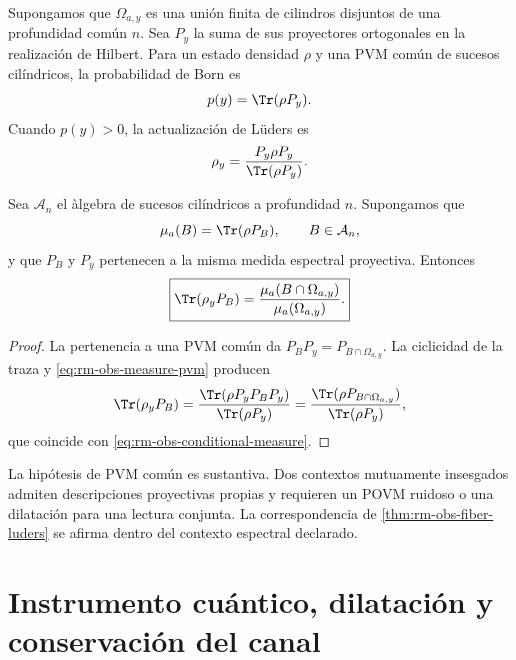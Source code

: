 Supongamos que \(\Omega_{a,y}\) es una uni\'on finita de cilindros
disjuntos de una profundidad com\'un \(n\). Sea \(P_y\) la suma de sus
proyectores ortogonales en la realizaci\'on de Hilbert. Para un estado
densidad \(\rho\) y una PVM com\'un de sucesos cil\'indricos, la probabilidad
de Born es
\begin{equation}
 p(y)=\Tr(\rho P_y).
 \label{eq:rm-obs-born}
\end{equation}
Cuando \(p(y)>0\), la actualizaci\'on de L\"uders \cite{Luders1951} es
\begin{equation}
 \rho_y=\frac{P_y\rho P_y}{\Tr(\rho P_y)}.
 \label{eq:rm-obs-luders}
\end{equation}

\begin{theorem}
\label{thm:rm-obs-fiber-luders}
Sea \(\mathcal A_n\) el \`algebra de sucesos cil\'indricos a profundidad
\(n\). Supongamos que
\begin{equation}
 \mu_a(B)=\Tr(\rho P_B),
 \qquad B\in\mathcal A_n,
 \label{eq:rm-obs-measure-pvm}
\end{equation}
y que \(P_B\) y \(P_y\) pertenecen a la misma medida espectral proyectiva.
Entonces
\begin{equation}
 \boxed{
 \Tr(\rho_yP_B)
 =\frac{\mu_a(B\cap\Omega_{a,y})}
 {\mu_a(\Omega_{a,y})}.}
 \label{eq:rm-obs-luders-fiber-equivalence}
\end{equation}
\end{theorem}

\begin{proof}
La pertenencia a una PVM com\'un da
\(P_BP_y=P_{B\cap\Omega_{a,y}}\). La ciclicidad de la traza y
\cref{eq:rm-obs-measure-pvm} producen
\[
 \Tr(\rho_yP_B)
 =\frac{\Tr(\rho P_yP_BP_y)}{\Tr(\rho P_y)}
 =\frac{\Tr(\rho P_{B\cap\Omega_{a,y}})}
 {\Tr(\rho P_y)},
\]
que coincide con \cref{eq:rm-obs-conditional-measure}.
\end{proof}

La hip\'otesis de PVM com\'un es sustantiva. Dos contextos mutuamente
insesgados admiten descripciones proyectivas propias y requieren un POVM
ruidoso o una dilataci\'on para una lectura conjunta. La correspondencia de
\cref{thm:rm-obs-fiber-luders} se afirma dentro del contexto espectral
declarado.

\section{Instrumento cu\'antico, dilataci\'on y conservaci\'on del canal}


